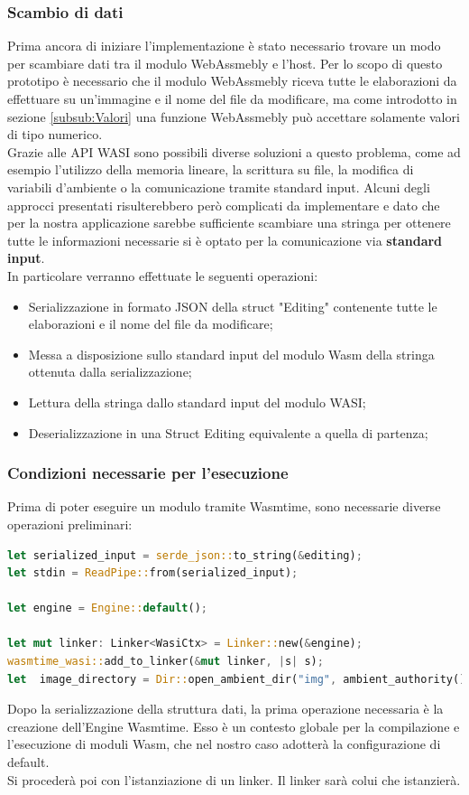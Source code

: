 \subsubsection{Scambio di dati}
Prima ancora di iniziare l'implementazione è stato necessario trovare un modo per scambiare dati tra il modulo WebAssmebly e l'host. Per lo scopo di questo prototipo è necessario che il modulo WebAssmebly riceva tutte le elaborazioni da effettuare su un'immagine e il nome del file da modificare, ma come introdotto in sezione \ref{subsub:Valori} una funzione WebAssmebly può accettare solamente valori di tipo numerico.
\\Grazie alle API WASI sono possibili diverse soluzioni a questo problema, come ad esempio l'utilizzo della memoria lineare, la scrittura su file, la modifica di variabili d'ambiente o la comunicazione tramite standard input.
Alcuni degli approcci presentati risulterebbero però complicati da implementare e dato che per la nostra applicazione sarebbe sufficiente scambiare una stringa per ottenere tutte le informazioni necessarie si è optato per la comunicazione via \textbf{standard input}.
\\In particolare verranno effettuate le seguenti operazioni:
\begin{itemize}
    \item Serializzazione in formato JSON della struct "Editing" contenente tutte le elaborazioni  e il nome del file da modificare;
    \item Messa a disposizione sullo standard input del modulo Wasm della stringa ottenuta dalla serializzazione;
    \item Lettura della stringa dallo standard input del modulo WASI;
    \item Deserializzazione in una Struct Editing equivalente a quella di partenza;
\end{itemize}
\subsubsection{Condizioni necessarie per l'esecuzione}
Prima di poter eseguire un modulo tramite Wasmtime, sono necessarie diverse operazioni preliminari:

\begin{lstlisting}[language=rust, label=lst:RustWasi, showstringspaces=false]
let serialized_input = serde_json::to_string(&editing);
let stdin = ReadPipe::from(serialized_input);

let engine = Engine::default();

let mut linker: Linker<WasiCtx> = Linker::new(&engine);
wasmtime_wasi::add_to_linker(&mut linker, |s| s); 
let  image_directory = Dir::open_ambient_dir("img", ambient_authority());
\end{lstlisting}
Dopo la serializzazione della struttura dati, la prima operazione necessaria è la creazione dell'Engine Wasmtime. Esso è un contesto globale per la compilazione e l'esecuzione di moduli Wasm, che nel nostro caso adotterà la configurazione di default.
\\Si procederà poi con l'istanziazione di un linker. Il linker sarà colui che istanzierà.


